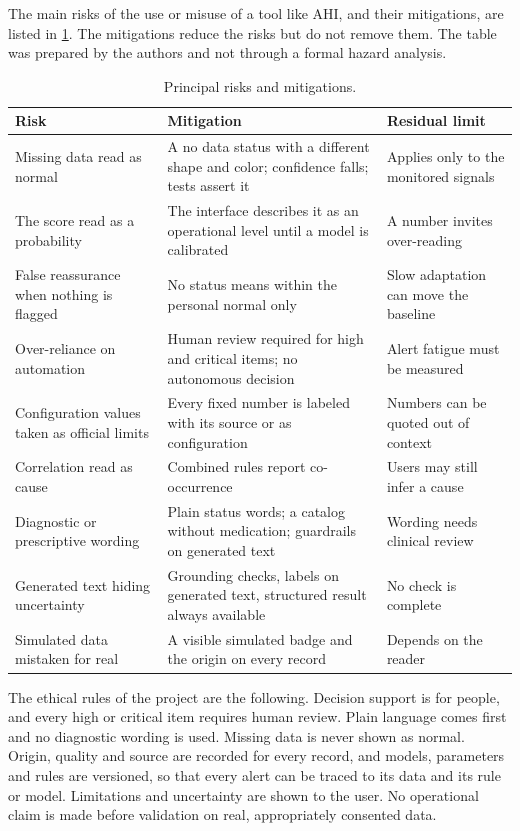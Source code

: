 The main risks of the use or misuse of a tool like AHI, and their mitigations, are listed in \ref{tab:risks}. The mitigations reduce the risks but do not remove them. The table was prepared by the authors and not through a formal hazard analysis.

\begin{table}[htbp]
\centering
\vspace{0.8em}
\caption{Principal risks and mitigations.}
\label{tab:risks}
\footnotesize
\begin{tabular}{p{4.0cm}p{5.6cm}p{4.4cm}}
\hline
\textbf{Risk} & \textbf{Mitigation} & \textbf{Residual limit} \\
\hline
Missing data read as normal & A no data status with a different shape and color; confidence falls; tests assert it & Applies only to the monitored signals \\
The score read as a probability & The interface describes it as an operational level until a model is calibrated & A number invites over-reading \\
False reassurance when nothing is flagged & No status means within the personal normal only & Slow adaptation can move the baseline \\
Over-reliance on automation & Human review required for high and critical items; no autonomous decision & Alert fatigue must be measured \\
Configuration values taken as official limits & Every fixed number is labeled with its source or as configuration & Numbers can be quoted out of context \\
Correlation read as cause & Combined rules report co-occurrence & Users may still infer a cause \\
Diagnostic or prescriptive wording & Plain status words; a catalog without medication; guardrails on generated text & Wording needs clinical review \\
Generated text hiding uncertainty & Grounding checks, labels on generated text, structured result always available & No check is complete \\
Simulated data mistaken for real & A visible simulated badge and the origin on every record & Depends on the reader \\
\hline
\end{tabular}
\vspace{1.2em}
\end{table}

The ethical rules of the project are the following. Decision support is for people, and every high or critical item requires human review. Plain language comes first and no diagnostic wording is used. Missing data is never shown as normal. Origin, quality and source are recorded for every record, and models, parameters and rules are versioned, so that every alert can be traced to its data and its rule or model. Limitations and uncertainty are shown to the user. No operational claim is made before validation on real, appropriately consented data.
